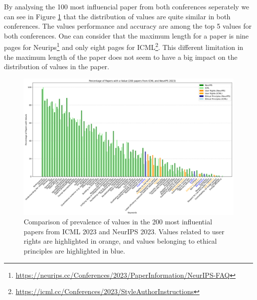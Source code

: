 \documentclass{article}
\begin{document}
By analysing the 100 most influencial paper from both conferences seperately we can see in Figure \ref{fig:percentage_comparison_conferences}
that the distribution of values are quite similar in both conferences. The values performance and accuracy are among the top 5 values for both conferences. 
One can consider that the maximum length for a paper is nine pages for Neurips\footnote{\url{https://neurips.cc/Conferences/2023/PaperInformation/NeurIPS-FAQ}} and only eight pages for ICML\footnote{\url{https://icml.cc/Conferences/2023/StyleAuthorInstructions}}.
This different limitation in the maximum length of the paper does not seem to have a big impact on the distribution of values in the paper.
\begin{figure}[H]
    \centering
    \includegraphics[width=\textwidth]{../plots/percentage_comparison_conferences.png}
    \caption{Comparison of prevalence of values in the 200 most influential papers from ICML 2023 and NeurIPS 2023. Values related to user rights are highlighted in orange, and values belonging to ethical principles are highlighted in blue.}
    \label{fig:percentage_comparison_conferences}
\end{figure}
\end{document}
